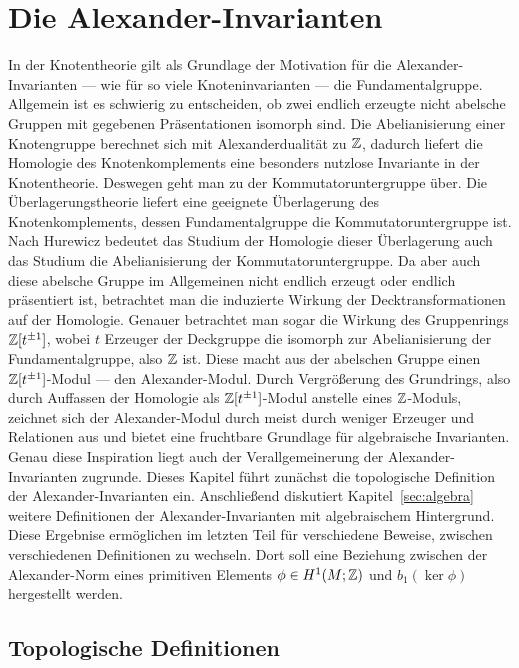 
\section{Die Alexander-Invarianten}

        In der Knotentheorie gilt als Grundlage der Motivation für die Alexander-Invarianten --- wie für so viele Knoteninvarianten --- die Fundamentalgruppe. Allgemein ist es schwierig zu entscheiden, ob zwei endlich erzeugte nicht abelsche Gruppen mit gegebenen Präsentationen isomorph sind. Die Abelianisierung einer Knotengruppe berechnet sich mit Alexanderdualität zu $\mathbb{Z}$, dadurch liefert die Homologie des Knotenkomplements eine besonders nutzlose Invariante in der Knotentheorie. Deswegen geht man zu der Kommutatoruntergruppe über. Die Überlagerungstheorie liefert eine geeignete Überlagerung des Knotenkomplements, dessen Fundamentalgruppe die Kommutatoruntergruppe ist. Nach Hurewicz bedeutet das Studium der Homologie dieser Überlagerung auch das Studium die Abelianisierung der Kommutatoruntergruppe. Da aber auch diese abelsche Gruppe im Allgemeinen nicht endlich erzeugt oder endlich präsentiert ist, betrachtet man die induzierte Wirkung der Decktransformationen auf der Homologie. Genauer betrachtet man sogar die Wirkung des Gruppenrings $\mathbb{Z} [t^{\pm 1}]$, wobei $t$ Erzeuger der Deckgruppe die isomorph zur Abelianisierung der Fundamentalgruppe, also $\mathbb{Z}$ ist. Diese macht aus der abelschen Gruppe einen $\mathbb{Z} [t^{\pm 1}]$-Modul --- den Alexander-Modul. Durch Vergrößerung des Grundrings, also durch Auffassen der Homologie als $\mathbb{Z}[t^{\pm 1}]$-Modul anstelle eines $\mathbb{Z}$-Moduls, zeichnet sich der Alexander-Modul durch meist durch weniger Erzeuger und Relationen aus und bietet eine fruchtbare Grundlage für algebraische Invarianten. Genau diese Inspiration liegt auch der Verallgemeinerung der Alexander-Invarianten zugrunde.
        Dieses Kapitel führt zunächst die topologische Definition der Alexander-Invarianten ein. Anschließend diskutiert Kapitel~\ref{sec:algebra} weitere Definitionen der Alexander-Invarianten mit algebraischem Hintergrund. Diese Ergebnise ermöglichen im letzten Teil für verschiedene Beweise, zwischen verschiedenen Definitionen zu wechseln. Dort soll eine Beziehung zwischen der Alexander-Norm eines primitiven Elements $\phi\in H^1(M;\mathbb{Z})$ und $b_1(\ker\phi)$ hergestellt werden.
    

   \subsection{Topologische Definitionen}
       \label{sec:alexdefs}

